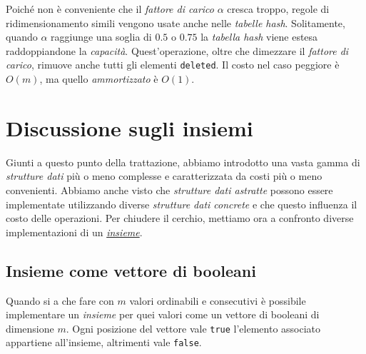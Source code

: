 \begin{note}
    Poiché non è conveniente che il \emph{fattore di carico} $\alpha$ cresca
    troppo, regole di ridimensionamento simili vengono usate anche nelle
    \emph{tabelle hash}. Solitamente, quando $\alpha$ raggiunge una soglia
    di $0.5$ o $0.75$ la \emph{tabella hash} viene estesa raddoppiandone la
    \emph{capacità}.  Quest'operazione, oltre che dimezzare il \emph{fattore di
    carico}, rimuove anche tutti gli elementi \texttt{deleted}. Il costo nel
    caso peggiore è $O(m)$, ma quello \emph{ammortizzato} è $O(1)$.
\end{note}

\section{Discussione sugli insiemi}
Giunti a questo punto della trattazione, abbiamo introdotto una vasta gamma di
\emph{strutture dati} più o meno complesse e caratterizzata da costi più o meno
convenienti. Abbiamo anche visto che \emph{strutture dati astratte} possono
essere implementate utilizzando diverse \emph{strutture dati concrete} e che
questo influenza il costo delle operazioni. Per chiudere il cerchio, mettiamo ora
a confronto diverse implementazioni di un \emph{\hyperref[def:28]{insieme}}.

\subsection{Insieme come vettore di booleani}
Quando si a che fare con $m$ valori ordinabili e consecutivi è possibile
implementare un \emph{insieme} per quei valori come un vettore di booleani di
dimensione $m$. Ogni posizione del vettore vale \texttt{true} l'elemento associato
appartiene all'insieme, altrimenti vale \texttt{false}.


